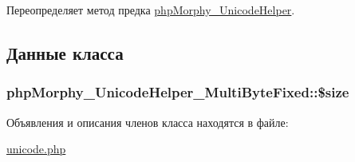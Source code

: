 Переопределяет метод предка \hyperlink{classphpMorphy__UnicodeHelper_a0802c954bf8d6866fe85729ce8ef2df5}{phpMorphy\_\-UnicodeHelper}.



\subsection{Данные класса}
\hypertarget{classphpMorphy__UnicodeHelper__MultiByteFixed_af3daa563809e7eb385bdacc7503521b8}{
\subsubsection[{\$size}]{\setlength{\rightskip}{0pt plus 5cm}phpMorphy\_\-UnicodeHelper\_\-MultiByteFixed::\$size}}
\label{classphpMorphy__UnicodeHelper__MultiByteFixed_af3daa563809e7eb385bdacc7503521b8}


Объявления и описания членов класса находятся в файле:\begin{DoxyCompactItemize}
\item 
\hyperlink{unicode_8php}{unicode.php}\end{DoxyCompactItemize}
